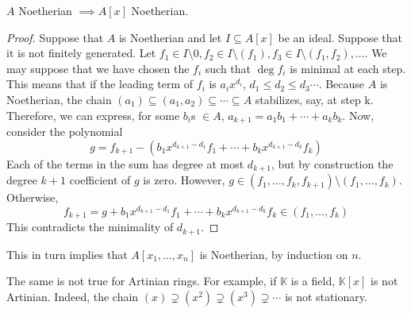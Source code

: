 \begin{theorem}
    $A$ Noetherian $\implies A[x]$ Noetherian.
    \begin{proof}
        Suppose that $A$ is Noetherian and let $I \subseteq A[x]$ be an ideal.
        Suppose that it is not finitely generated.
        Let $f_1 \in I \setminus 0,
        f_2 \in I \setminus (f_1),
        f_3 \in I \setminus (f_1, f_2),
        \dots$.
        We may suppose that we have chosen the $f_i$ such that $\deg f_i$ is minimal at each step.
        This means that if the leading term of $f_i$ is $a_i x^{d_i}$,
        $d_1 \leq d_2 \leq d_3 \cdots$.
        Because $A$ is Noetherian, the chain
        $(a_1) \subseteq (a_1, a_2) \subseteq \cdots \subseteq A$
        stabilizes, say, at step k.
        Therefore, we can express, for some $b_i$s $\in A$,
        $a_{k+1} = a_1 b_1 + \cdots + a_{k} b_{k}$.
        Now, consider the polynomial
        \[
            g = f_{k+1} - ( b_1 x^{d_{k+1} - d_1} f_1 + \cdots + b_k x^{d_{k+1} - d_k} f_k)
        \]
        Each of the terms in the sum has degree at most $d_{k+1}$,
        but by construction the degree $k+1$ coefficient of $g$ is zero.
        However, $g \in (f_1, \dots, f_k, f_{k+1}) \setminus (f_1, \dots, f_k)$.
        Otherwise,
        \[
        f_{k+1} = g + b_1 x^{d_{k+1} - d_1} f_1 +
        \cdots + b_k x^{d_{k+1} - d_k} f_k \in (f_1, \dots, f_k)
        \]
        This contradicts the minimality of $d_{k+1}$.


    \end{proof}
\end{theorem}

\begin{rk}
    This in turn implies that $A[x_1, \dots, x_n]$ is Noetherian, by induction on $n$.
\end{rk}

\begin{rk}
    The same is not true for Artinian rings.
    For example, if $\mathbb{K}$ is a field, $\mathbb{K}[x]$ is not Artinian.
    Indeed, the chain $(x) \supsetneq (x^2) \supsetneq (x^3) \supsetneq \cdots$ is not stationary.
\end{rk}